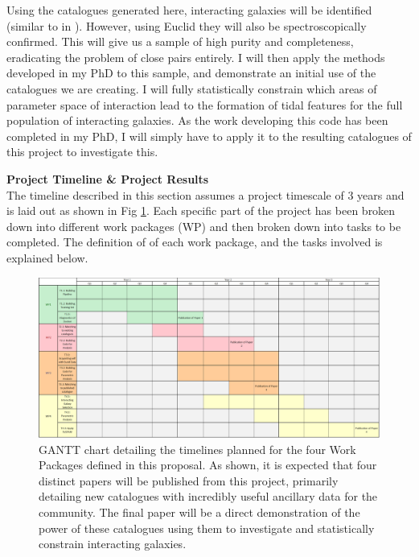 \documentclass[11pt,usenatbib]{article}
\begin{document}
Using the catalogues generated here, interacting galaxies will be identified (similar to in \citet{O'Ryan}). However, using Euclid they will also be spectroscopically confirmed. This will give us a sample of high purity and completeness, eradicating the problem of close pairs entirely. I will then apply the methods developed in my PhD to this sample, and demonstrate an initial use of the catalogues we are creating. I will fully statistically constrain which areas of parameter space of interaction lead to the formation of tidal features for the full population of interacting galaxies. As the work developing this code has been completed in my PhD, I will simply have to apply it to the resulting catalogues of this project to investigate this. 

\vspace{-3mm}
\describearchival
\vspace{-3mm}
\noindent\textbf{Project Timeline \& Project Results} \\
\noindent The timeline described in this section assumes a project timescale of 3 years and is laid out as shown in Fig \ref{fig:gantt-chart}. Each specific part of the project has been broken down into different work packages (WP) and then broken down into tasks to be completed. The definition of of each work package, and the tasks involved is explained below.

\begin{figure}
    \centering
    \includegraphics[width = \textwidth]{figures/draft-gantt.png}
    \caption{GANTT chart detailing the timelines planned for the four Work Packages defined in this proposal. As shown, it is expected that four distinct papers will be published from this project, primarily detailing new catalogues with incredibly useful ancillary data for the community. The final paper will be a direct demonstration of the power of these catalogues using them to investigate and statistically constrain interacting galaxies.}
    \label{fig:gantt-chart}
\end{figure}
\end{document}
